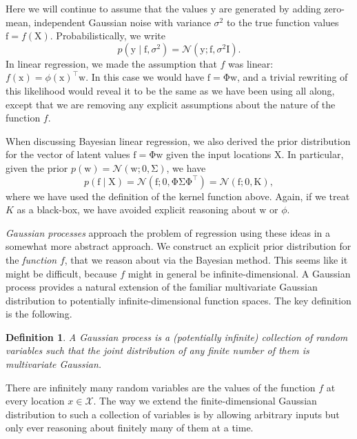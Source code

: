 \documentclass{article}
\newtheorem{defn}{Definition}
\newcommand{\given}{\mid}
\newcommand{\mc}[1]{\mathcal{#1}}
\newcommand{\trans}{^\top}
\newcommand{\mat}[1]{\bm{\mathrm{#1}}}
\renewcommand{\vec}[1]{\bm{\mathrm{#1}}}
\begin{document}
Here we will continue to assume that the values $\vec{y}$ are
generated by adding zero-mean, independent Gaussian noise with
variance $\sigma^2$ to the true function values $\vec{f} =
f(\mat{X})$.  Probabilistically, we write
\begin{equation*}
  p(\vec{y} \given \vec{f}, \sigma^2)
  =
  \mc{N}(\vec{y}; \vec{f}, \sigma^2 \mat{I}).
\end{equation*}
In linear regression, we made the assumption that $f$ was linear:
$f(\vec{x}) = \phi(\vec{x})\trans\vec{w}$.  In this case we would have
$\vec{f} = \mat{\Phi}\vec{w}$, and a trivial rewriting of this
likelihood would reveal it to be the same as we have been using all
along, except that we are removing any explicit assumptions about the
nature of the function $f$.

When discussing Bayesian linear regression, we also derived the prior
distribution for the vector of latent values $\vec{f} =
\mat{\Phi}\vec{w}$ given the input locations $\mat{X}$.  In
particular, given the prior $p(\vec{w}) = \mc{N}(\vec{w}; \vec{0},
\mat{\Sigma})$, we have
\begin{equation*}
  p(\vec{f} \given \mat{X})
  =
  \mc{N}(\vec{f}; \vec{0}, \mat{\Phi}\mat{\Sigma}\mat{\Phi}\trans)
  =
  \mc{N}(\vec{f}; \vec{0}, \mat{K}),
\end{equation*}
where we have used the definition of the kernel function above.
Again, if we treat $K$ as a black-box, we have avoided explicit
reasoning about $\vec{w}$ or $\phi$.

\emph{Gaussian processes} approach the problem of regression using
these ideas in a somewhat more abstract approach.  We construct an
explicit prior distribution for the \emph{function} $f$, that we
reason about via the Bayesian method.  This seems like it might be
difficult, because $f$ might in general be infinite-dimensional.  A
Gaussian process provides a natural extension of the familiar
multivariate Gaussian distribution to potentially infinite-dimensional
function spaces.  The key definition is the following.
\begin{defn}
  A \emph{Gaussian process} is a (potentially infinite) collection of
  random variables such that the joint distribution of any finite
  number of them is multivariate Gaussian.
\end{defn}
There are infinitely many random variables are the values of the
function $f$ at every location $x \in \mc{X}$.  The way we extend the
finite-dimensional Gaussian distribution to such a collection of
variables is by allowing arbitrary inputs but only ever reasoning
about finitely many of them at a time.
\end{document}
